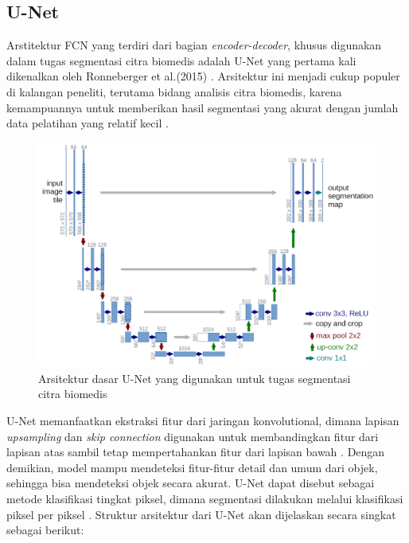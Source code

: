 \subsection{U-Net}

\noindent Arstitektur FCN yang terdiri dari bagian \textit{encoder-decoder}, khusus digunakan dalam tugas segmentasi citra biomedis adalah U-Net yang pertama kali dikenalkan oleh Ronneberger et al.(2015) \cite{ronneberger_u-net_2015}. Arsitektur ini menjadi cukup populer di kalangan peneliti, terutama bidang analisis citra biomedis, karena kemampuannya untuk memberikan hasil segmentasi yang akurat dengan jumlah data pelatihan yang relatif kecil \cite{williams_unified_2023}.

\begin{figure}[H]
	\centering
	\includegraphics[scale=.2]{gambar/U-Net.png}
	\caption{Arsitektur dasar U-Net yang digunakan untuk tugas segmentasi citra biomedis \cite{ronneberger_u-net_2015}}
	\label{fig:U-net}
\end{figure}

\noindent U-Net memanfaatkan ekstraksi fitur dari jaringan konvolutional, dimana lapisan \textit{upsampling} dan \textit{skip connection} digunakan untuk membandingkan fitur dari lapisan atas sambil tetap mempertahankan fitur dari lapisan bawah \cite{huang_fully_2022}. Dengan demikian, model mampu mendeteksi fitur-fitur detail dan umum dari objek, sehingga bisa mendeteksi objek secara akurat. U-Net dapat disebut sebagai metode klasifikasi tingkat piksel, dimana segmentasi dilakukan melalui klasifikasi piksel per piksel \cite{siddique_u-net_2020}. Struktur arsitektur dari U-Net akan dijelaskan secara singkat sebagai berikut:

